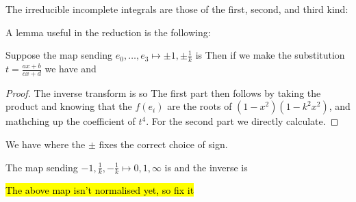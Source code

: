 \documentclass{article}
\begin{document}
\begin{idea}
	The irreducible incomplete integrals are those of the first, second, and third kind:
\end{idea}

A lemma useful in the reduction is the following:
\begin{prop}
	Suppose the map sending $e_0, \dots, e_3 \mapsto \pm 1, \pm \frac{1}{k}$ is 
Then if we make the substitution $t = \frac{ax+b}{cx+d}$ we have 
and 
\end{prop}
\begin{proof}
The inverse transform is 
so 
The first part then follows by taking the product and knowing that the $f(e_i)$ are the roots of $(1-x^2)(1-k^2x^2)$, and mathching up the coefficient of $t^4$. For the second part we directly calculate. 
\end{proof}

\begin{corollary}
	We have
where the $\pm$ fixes the correct choice of sign. 
\end{corollary}

\begin{lemma}
	The map sending $-1,\frac{1}{k},-\frac{1}{k} \mapsto 0,1,\infty$ is 
and the inverse is 
\end{lemma}
\begin{remark}
	\hl{The above map isn't normalised yet, so fix it}
\end{remark}
\end{document}
